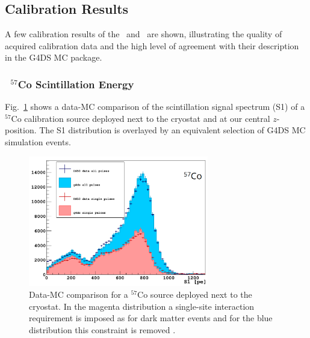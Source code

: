 

\subsection{Calibration Results}
A few calibration results of the \tpc\ and \lsv\ are shown, illustrating the quality of acquired calibration data and the high level of agreement with their description in the G4DS MC package.

\subsubsection{\tpc\ $^{57}$Co Scintillation Energy}
Fig.~\ref{fig:CalibData:Co57} shows a data-MC comparison of the scintillation signal spectrum (S1) of a $^{57}$Co calibration source deployed next to the cryostat and at our central $z$-position. The S1 distribution is overlayed by an equivalent selection of G4DS MC simulation events.

\begin{figure}[htbp]
\centering
\includegraphics[width=0.7\textwidth]{./Figures/57Co_Paolo_G4DS_UCLA.png}
\caption{Data-MC comparison for a $^{57}$Co source deployed next to the cryostat. In the magenta distribution a single-site interaction requirement is imposed as for dark matter events and for the blue distribution this constraint is removed \cite{DS50:G4DS:paper}.
\label{fig:CalibData:Co57}}
 \end{figure}

